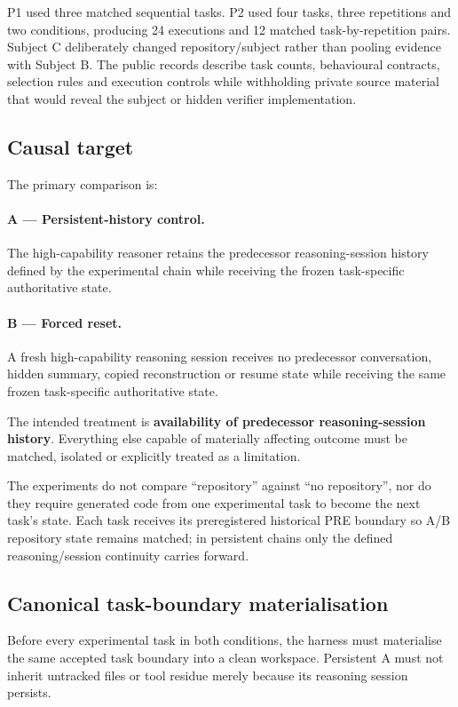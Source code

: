 P1 used three matched sequential tasks. P2 used four tasks, three repetitions and two conditions, producing 24 executions and 12 matched task-by-repetition pairs. Subject C deliberately changed repository/subject rather than pooling evidence with Subject B. The public records describe task counts, behavioural contracts, selection rules and execution controls while withholding private source material that would reveal the subject or hidden verifier implementation.

\subsection{Causal target}

The primary comparison is:

\paragraph{A --- Persistent-history control.}
The high-capability reasoner retains the predecessor reasoning-session history defined by the experimental chain while receiving the frozen task-specific authoritative state.

\paragraph{B --- Forced reset.}
A fresh high-capability reasoning session receives no predecessor conversation, hidden summary, copied reconstruction or resume state while receiving the same frozen task-specific authoritative state.

The intended treatment is \textbf{availability of predecessor reasoning-session history}. Everything else capable of materially affecting outcome must be matched, isolated or explicitly treated as a limitation.

The experiments do not compare “repository” against “no repository”, nor do they require generated code from one experimental task to become the next task's state. Each task receives its preregistered historical PRE boundary so A/B repository state remains matched; in persistent chains only the defined reasoning/session continuity carries forward.

\subsection{Canonical task-boundary materialisation}

Before every experimental task in both conditions, the harness must materialise the same accepted task boundary into a clean workspace. Persistent A must not inherit untracked files or tool residue merely because its reasoning session persists.

